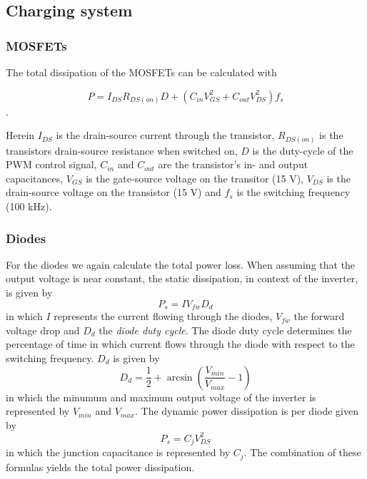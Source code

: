 \documentclass[11pt,titlepage]{report}
\begin{document}
\begin{appendices}
\renewcommand{\chapternumber}{\appendixname\space\thechapter}

\chapter{Charging system}
\label{app:chargingsystem}
\subsection{MOSFETs}
The total dissipation of the MOSFETs can be calculated with

\begin{equation}
P = I_{DS}R_{DS(on)}D +	(C_{in}V_{GS}^2 + C_{out}V_{DS}^2)f_{s}
\end{equation}.

Herein $I_{DS}$ is the drain-source current through the transistor, $R_{DS(on)}$ is the transistors drain-source resistance when switched on, $D$ is the duty-cycle of the PWM control signal, $C_{in}$ and $C_{out}$ are the transistor’s in- and output capacitances, $V_{GS}$ is the gate-source voltage on the
transitor (15 V), $V_{DS}$ is the drain-source voltage on the transistor (15 V) and $f_{s}$ is the switching frequency (100 kHz). 

\subsection{Diodes}
For the diodes we again calculate the total power loss. When assuming that the output voltage is near constant, the static dissipation, in context of the inverter, is given by
\begin{equation}
\label{eq:ass1-diode-static-power}
	P_s = I V_{fw} D_{d}
\end{equation}
in which $I$ represents the current flowing through the diodes, $V_{fw}$ the forward voltage drop and $D_{d}$ the \textit{diode duty cycle}. The diode duty cycle determines the percentage of time in which current flows through the diode with respect to the switching frequency. $D_{d}$ is given by
\begin{equation}
\label{eq:ass1-diode-dutycycle}
	D_d = \frac{1}{2}+\arcsin{ \left( \frac{V_{min}}{V_{max}}-1 \right) }
\end{equation}
in which the minumum and maximum output voltage of the inverter is represented by $V_{min}$ and $V_{max}$. The dynamic power dissipation is per diode given by
\begin{equation}
\label{eq:ass1-diode-dynamic-power}
	P_s = C_j V_{DS}^2
\end{equation}
in which the junction capacitance is represented by $C_j$. The combination of these formulas yields the total power dissipation.


\end{appendices}
\end{document}
